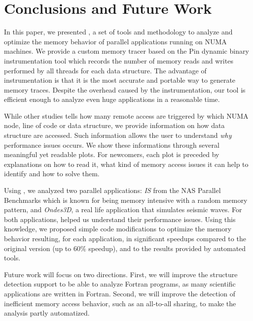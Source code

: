 
\section{Conclusions and Future Work}
\label{sec:concl}

In this paper, we presented \TABARNAC, a set of tools and methodology to analyze and
optimize the memory behavior of parallel applications running on NUMA
machines. We provide a custom memory tracer
based on the Pin dynamic binary instrumentation tool which records the
number of memory reads and writes performed by all threads for each data structure.
The advantage of instrumentation is that it is the most
accurate and portable way to generate memory traces.
Despite the overhead caused by the instrumentation, our tool is efficient enough to analyze even huge applications in a reasonable time.

While other studies tells how many remote access are triggered by which NUMA
node, line of code or data structure, we provide information on how data
structure are accessed. Such information allows the user to understand
\emph{why} performance issues occurs. We show these informations through
several  meaningful yet readable plots. For newcomers, each plot is preceded by explanations
on how to read it, what kind of memory access issues it can help to identify
and how to solve them.

Using \TABARNAC, we analyzed two parallel applications: \emph{IS} from the NAS
Parallel Benchmarks which is known for being memory intensive with a random
memory pattern, and \emph{Ondes3D}, a real life application that
simulates seismic waves. For both applications, \TABARNAC helped us
understand their performance issues.  Using this knowledge, we proposed
simple code modifications to optimize the memory behavior resulting, for each
application, in significant speedups compared to the original version (up to
$60\%$ speedup), and to the results provided by automated tools.

Future work will focus on two directions. First, we will improve the
structure detection support to be able to analyze Fortran programs, as many
scientific applications are written in Fortran. Second, we will improve the
detection of inefficient memory access behavior, such as an all-to-all
sharing, to make the analysis partly automatized.
